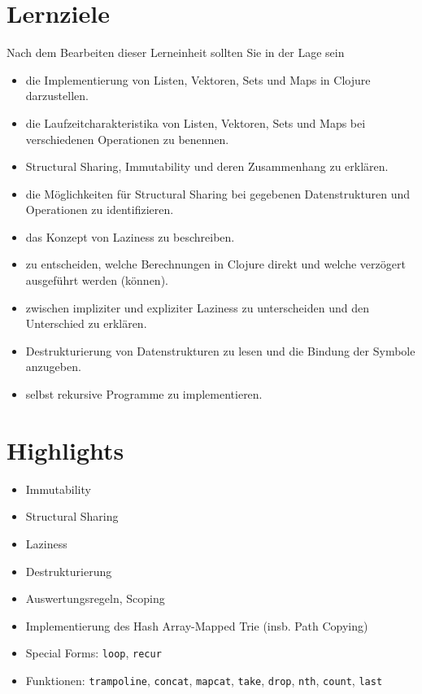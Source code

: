\documentclass[11pt,a4paper]{article}
\theoremstyle{break}
\begin{document}
\section{Lernziele}

Nach dem Bearbeiten dieser Lerneinheit sollten Sie in der Lage sein

\begin{itemize}
    \item die Implementierung von Listen, Vektoren, Sets und Maps in Clojure darzustellen.
    \item die Laufzeitcharakteristika von Listen, Vektoren, Sets und Maps bei verschiedenen Operationen zu benennen.
    \item Structural Sharing, Immutability und deren Zusammenhang zu erkl\"aren.
    \item die M\"oglichkeiten f\"ur Structural Sharing bei gegebenen Datenstrukturen und Operationen zu identifizieren.
    \item das Konzept von Laziness zu beschreiben.
    \item zu entscheiden, welche Berechnungen in Clojure direkt und welche verzögert ausgef\"uhrt werden (k\"onnen).
    \item zwischen impliziter und expliziter Laziness zu unterscheiden und den Unterschied zu erkl\"aren.
    \item Destrukturierung von Datenstrukturen zu lesen und die Bindung der Symbole anzugeben.
    \item selbst rekursive Programme zu implementieren.
\end{itemize}

\section{Highlights}

\begin{itemize}
    \item Immutability
    \item Structural Sharing
    \item Laziness
    \item Destrukturierung
    \item Auswertungsregeln, Scoping
    \item Implementierung des Hash Array-Mapped Trie (insb. Path Copying)
    \item Special Forms: \verb|loop|, \verb|recur|
    \item Funktionen: \verb|trampoline|, \verb|concat|, \verb|mapcat|, \verb|take|, \verb|drop|, \verb|nth|, \verb|count|, \verb|last|
\end{itemize}
\end{document}
